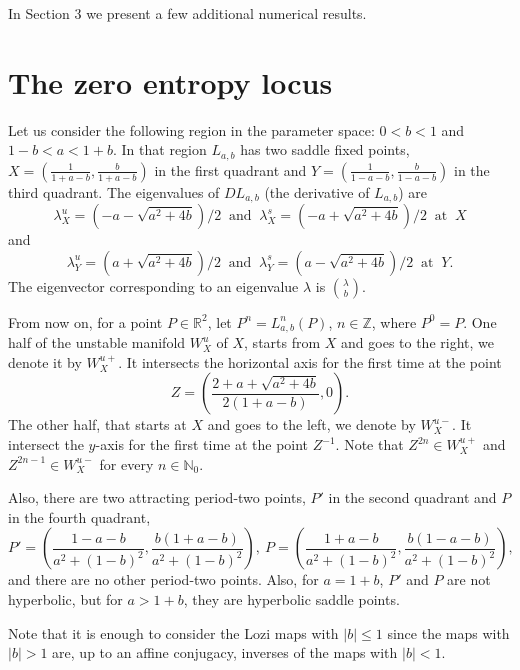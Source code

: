 \documentclass[12pt]{amsart}
\theoremstyle{plain}
\theoremstyle{definition}
\def\N{{\mathbb N}}
\def\Z{{\mathbb Z}}
\begin{document}
	In Section 3 we present a few additional numerical results.
	
	\section{The zero entropy locus}\label{sec:zel}
	
	Let us consider the following region in the parameter space: $0 < b < 1$ 
	and $1 - b < a < 1 + b$. In that region $L_{a,b}$ has two saddle fixed 
	points, $X = (\frac{1}{1+a-b}, \frac{b}{1+a-b})$ in the first quadrant 
	and $Y = (\frac{1}{1-a-b}, \frac{b}{1-a-b})$ in the third quadrant. The 
	eigenvalues of $DL_{a,b}$ (the derivative of $L_{a,b}$) are 
	\begin{equation*}\label{e:X}
		\lambda^u_X = (-a - \sqrt{a^2 + 4b})/2 \ \textrm{ and } \ 
		\lambda_X^s = (-a + \sqrt{a^2 + 4b})/2
		\ \textrm{ at } \ X
	\end{equation*}
	and 
	\begin{equation*}\label{e:Y}
		\lambda_Y^u = (a + \sqrt{a^2 + 4b})/2 \ \textrm{ and } \ 
		\lambda_Y^s = (a - \sqrt{a^2 + 4b})/2
		\ \textrm{ at } \ Y.
	\end{equation*}
	The eigenvector corresponding to an eigenvalue $\lambda$ is 
	$\lambda \choose b$. 
	
	From now on, for a point $P \in \mathbb{R}^2$, let $P^n = L_{a,b}^n(P)$, 
	$n \in \Z$, where $P^0 = P$. One half of the unstable manifold $W^u_X$ 
	of $X$, starts from $X$ and goes to the right, we denote it by 
	$W^{u+}_X$. It intersects the horizontal axis for the first time 
	at the point
	$$Z = \left( \frac{2 + a + \sqrt{a^2 + 4b}}{2(1+a-b)}, 0 \right).$$
	The other half, that starts at $X$ and goes to the left, we denote 
	by $W^{u-}_X$. It intersect the $y$-axis for the first time at the 
	point $Z^{-1}$. Note that $Z^{2n} \in W^{u+}_X$ and 
	$Z^{2n-1} \in W^{u-}_X$ for every $n \in \N_0$. 
	
	Also, there are two attracting period-two points, $P'$ in the 
	second quadrant and $P$ in the fourth quadrant,
	$$
	P'=\left(\frac{1-a-b}{a^2+(1-b)^2},\frac{b(1+a-b)}{a^2+(1-b)^2}\right), 
	\ P=\left(\frac{1+a-b}{a^2+(1-b)^2},\frac{b(1-a-b)}{a^2+(1-b)^2}\right),
	$$ 
	and there are no other period-two points. Also, for $a = 1 + b$, $P'$ 
	and $P$ are not hyperbolic, but for $a > 1 + b$, they are hyperbolic 
	saddle points. 
	
	Note that it is enough to consider the Lozi maps with $|b| \le 1$ since 
	the maps with $|b| > 1$ are, up to an affine conjugacy, inverses of the 
	maps with $|b| < 1$. 		
	
\end{document}
